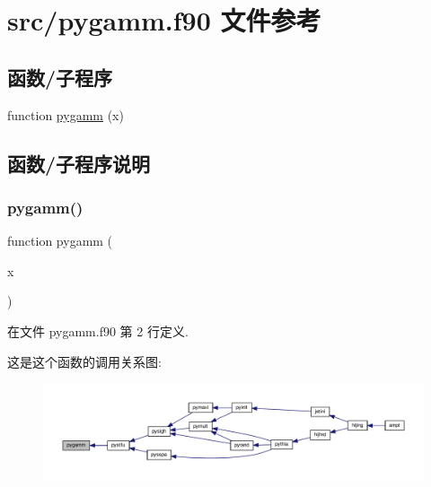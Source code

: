 \hypertarget{pygamm_8f90}{}\section{src/pygamm.f90 文件参考}
\label{pygamm_8f90}
\subsection*{函数/子程序}
\begin{DoxyCompactItemize}
\item 
function \mbox{\hyperlink{pygamm_8f90_a13a4635fb293feeda29ce0d7e08bf0a5}{pygamm}} (x)
\end{DoxyCompactItemize}


\subsection{函数/子程序说明}
\mbox{\label{pygamm_8f90_a13a4635fb293feeda29ce0d7e08bf0a5}} 
\subsubsection{\texorpdfstring{pygamm()}{pygamm()}}
{\footnotesize\ttfamily function pygamm (\begin{DoxyParamCaption}\item[{}]{x }\end{DoxyParamCaption})}



在文件 pygamm.\+f90 第 2 行定义.

这是这个函数的调用关系图\+:
\nopagebreak
\begin{figure}[H]
\begin{center}
\leavevmode
\includegraphics[width=350pt]{pygamm_8f90_a13a4635fb293feeda29ce0d7e08bf0a5_icgraph}
\end{center}
\end{figure}
